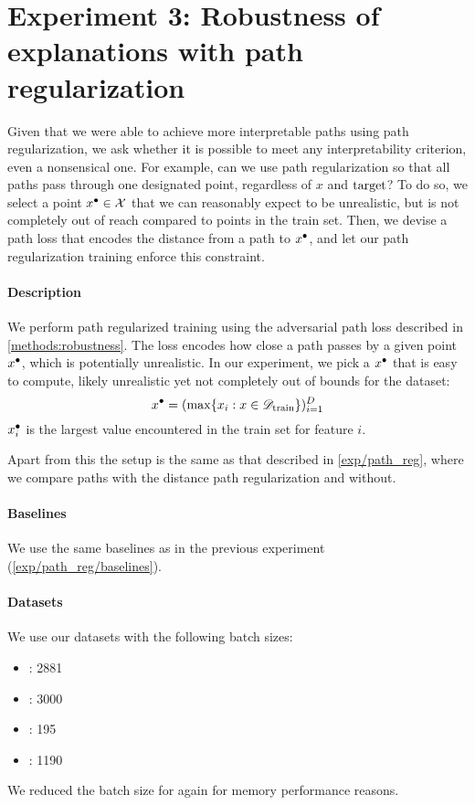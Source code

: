 \documentclass[../main.tex]{subfiles}
\begin{document}
\section{Experiment 3: Robustness of explanations with path regularization}

Given that we were able to achieve more interpretable paths using path regularization, we ask whether it is possible to meet any interpretability criterion, even a nonsensical one.
For example, can we use path regularization so that all paths pass through one designated point, regardless of $x$ and $\mathrm{target}$?
To do so, we select a point $x^\bullet \in \mathcal{X}$ that we can reasonably expect to be unrealistic, but is not completely out of reach compared to points in the train set.
Then, we devise a path loss that encodes the distance from a path to $x^\bullet$, and let our path regularization training enforce this constraint.

\paragraph{Description}

We perform path regularized training using the adversarial path loss described in \autoref{methods:robustness}.
The loss encodes how close a path passes by a given point $x^\bullet$, which is potentially unrealistic.
In our experiment, we pick a $x^\bullet$ that is easy to compute, likely unrealistic yet not completely out of bounds for the dataset:
\begin{equation}
    x^\bullet = (\max\{ x_i : x \in \mathscr{D}_\text{train} \})_{i=1}^D
\end{equation}
\ie{} $x^\bullet_i$ is the largest value encountered in the train set for feature $i$.

Apart from this the setup is the same as that described in \autoref{exp/path_reg}, where we compare paths with the distance path regularization and without.

\paragraph{Baselines}

We use the same baselines as in the previous experiment (\autoref{exp/path_reg/baselines}).

\paragraph{Datasets}

We use our datasets with the following batch sizes:
\begin{itemize}
    \item \CakeOnSea: 2881
    \item \ForestCover: 3000
    \item \WineQuality: 195
    \item \OnlineNewsPopularity: 1190
\end{itemize}
We reduced the batch size for \ForestCover{} again for memory performance reasons.
\end{document}
